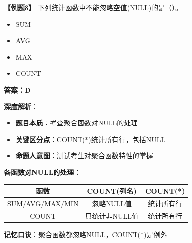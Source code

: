 \documentclass[12pt, a4paper]{article}
\newenvironment{bluebox}[1]{%
  \begin{trivlist}
  \item[\hskip\labelsep \textbf{#1}]
  \setlength{\parskip}{0.5ex}
  \setlength{\itemsep}{0.5ex}
}{%
  \end{trivlist}
}
\begin{document}
\begin{bluebox}{例题8：统计函数}
	\textbf{【例题8】} 下列统计函数中不能忽略空值(NULL)的是（\quad）。

	\begin{itemize}
		\item[A)] SUM
		\item[B)] AVG
		\item[C)] MAX
		\item[D)] COUNT
	\end{itemize}

	\textbf{答案：D}

	\textbf{深度解析}：

	\begin{itemize}
		\item \textbf{题目本质}：考查聚合函数对NULL的处理
		\item \textbf{关键区分点}：COUNT(*)统计所有行，包括NULL
		\item \textbf{命题人意图}：测试考生对聚合函数特性的掌握
	\end{itemize}

	\textbf{各函数对NULL的处理}：
	\begin{tabular}{|c|c|c|}
		\hline
		\textbf{函数}     & \textbf{COUNT(列名)} & \textbf{COUNT(*)} \\
		\hline
		SUM/AVG/MAX/MIN & 忽略NULL值            & 统计所有行             \\
		\hline
		COUNT           & 只统计非NULL值          & 统计所有行             \\
		\hline
	\end{tabular}

	\textbf{记忆口诀}：聚合函数都忽略NULL，COUNT(*)是例外
\end{bluebox}
\end{document}
